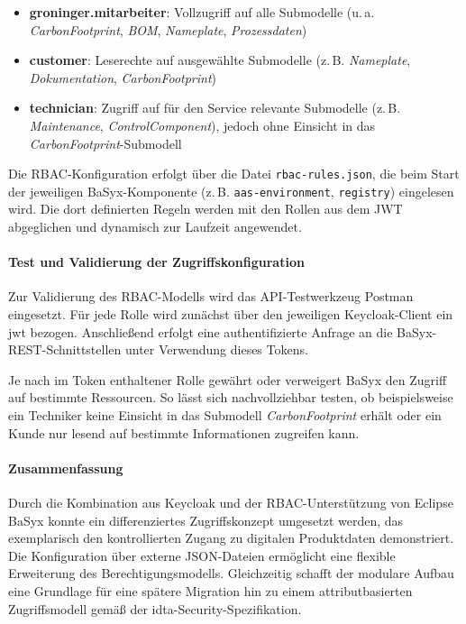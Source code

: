 \begin{itemize}[noitemsep, leftmargin=*]
    \item \textbf{groninger.mitarbeiter}: Vollzugriff auf alle Submodelle (u.\,a. \textit{CarbonFootprint}, \textit{BOM}, \textit{Nameplate}, \textit{Prozessdaten})
    \item \textbf{customer}: Leserechte auf ausgewählte Submodelle (z.\,B. \textit{Nameplate}, \textit{Dokumentation}, \textit{CarbonFootprint})
    \item \textbf{technician}: Zugriff auf für den Service relevante Submodelle (z.\,B. \textit{Maintenance}, \textit{ControlComponent}), jedoch ohne Einsicht in das \textit{CarbonFootprint}-Submodell
\end{itemize}

Die RBAC-Konfiguration erfolgt über die Datei \texttt{rbac-rules.json}, die beim Start der jeweiligen BaSyx-Komponente (z.\,B. \texttt{aas-environment}, \texttt{registry}) eingelesen wird. Die dort definierten Regeln werden mit den Rollen aus dem JWT abgeglichen und dynamisch zur Laufzeit angewendet.

\paragraph{Test und Validierung der Zugriffskonfiguration}

Zur Validierung des RBAC-Modells wird das API-Testwerkzeug Postman eingesetzt. Für jede Rolle wird zunächst über den jeweiligen Keycloak-Client ein \ac{jwt} bezogen. Anschließend erfolgt eine authentifizierte Anfrage an die BaSyx-REST-Schnittstellen unter Verwendung dieses Tokens.

Je nach im Token enthaltener Rolle gewährt oder verweigert BaSyx den Zugriff auf bestimmte Ressourcen. So lässt sich nachvollziehbar testen, ob beispielsweise ein Techniker keine Einsicht in das Submodell \textit{CarbonFootprint} erhält oder ein Kunde nur lesend auf bestimmte Informationen zugreifen kann.

\paragraph{Zusammenfassung}

Durch die Kombination aus Keycloak und der RBAC-Unterstützung von Eclipse BaSyx konnte ein differenziertes Zugriffskonzept umgesetzt werden, das exemplarisch den kontrollierten Zugang zu digitalen Produktdaten demonstriert. Die Konfiguration über externe JSON-Dateien ermöglicht eine flexible Erweiterung des Berechtigungsmodells. Gleichzeitig schafft der modulare Aufbau eine Grundlage für eine spätere Migration hin zu einem attributbasierten Zugriffsmodell gemäß der \acs{idta}-Security-Spezifikation.





